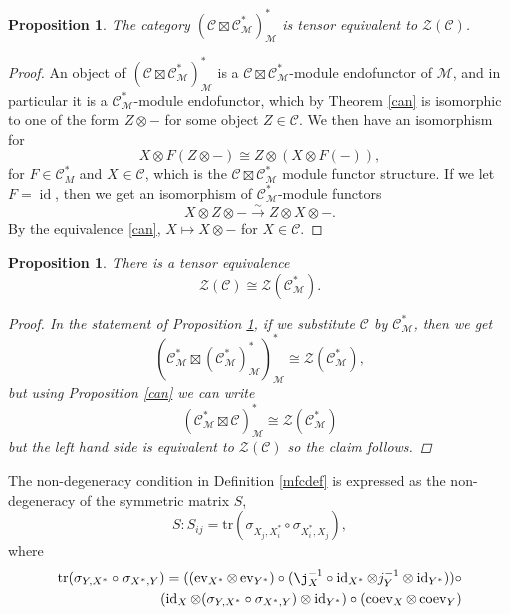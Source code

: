 \documentclass[11pt]{book}
\newtheorem{Prop}[theorem]{Proposition}
\theoremstyle{Rem}
\theoremstyle{definition}
\numberwithin{equation}{section}
\newcommand\inv{^{-1}}
\newcommand\id{\operatorname{id}}
\newcommand\ot{\otimes}
\newcommand\M{\mathcal{M}}
\newcommand\C{\mathcal C}
\newcommand\CTR{\mathcal Z}
\newcommand{\xra}\xrightarrow
\newcommand\ev{\operatorname{ev}}
\newcommand\coev{\operatorname{coev}}
\begin{document}
\begin{Prop}\label{centereqv}
The category $(\C\boxtimes \C^*_\M)^*_\M$ is tensor equivalent to $\CTR(\C)$.
\end{Prop}
\begin{proof}
An object of $(\C\boxtimes \C^*_\M)^*_\M$ is a $\C\boxtimes \C^*_\M$-module endofunctor of $\M$, and in particular it is a $\C^*_\M$-module endofunctor, which by Theorem \ref{can} is isomorphic to one of the form $Z\ot -$ for some object $Z\in \C$. We then have an isomorphism for \begin{equation}
	X\ot F(Z\ot -) \cong Z\ot(X\ot F(-)),
\end{equation}for $F\in \C^*_M$ and $X \in \C$, which is the $\C \boxtimes \C^*_\M$ module functor structure. If we let $F=\id$, then we get an isomorphism of $\C^*_\M$-module functors \begin{equation}
	X\ot Z \ot -\xra{\sim} Z\ot X\ot -.
\end{equation}
By the equivalence \ref{can}, $X\mapsto X\ot -$ for $X\in \C$. 

\end{proof}
\begin{Prop}
There is a tensor equivalence \begin{equation}
	\CTR(\C)\cong \CTR(\C^*_\M).
\end{equation}
\begin{proof}
In the statement of Proposition \ref{centereqv}, if we substitute $\C$ by $\C^*_\M$, then we get 
\begin{equation}
	(\C^*_\M \boxtimes (\C^*_\M)^*_\M)^*_\M \cong \CTR(\C^*_\M),
\end{equation} but using Proposition \ref{can} we can write \begin{equation}
	(\C^*_\M \boxtimes \C)^*_\M \cong \CTR(\C^*_\M)
\end{equation} but the left hand side is equivalent to $\CTR(\C)$ so the claim follows.
\end{proof}
\end{Prop}

 The non-degeneracy condition in Definition \ref{mfcdef} is expressed as the non-degeneracy of the symmetric matrix $S$, 
\begin{equation}\label{S}
	S: S_{ij}= \text{tr}(\sigma_{X_j,X_i^*}\circ\sigma_{X_i^*,X_j}),
\end{equation}
where \begin{align}
	\text{tr}(\sigma_{Y,X^*}\circ\sigma_{X^*,Y}) = ((\ev_{X^*}\otimes \ev_{Y^*}) \circ (\j_{X}\inv\circ\id_{X^*} \otimes j_Y\inv \otimes \id_{Y^*}))\circ\\ (\id_X\otimes (\sigma_{Y,X^*}\circ\sigma_{X^*, Y}) \otimes \id_{Y^*})\circ (\coev_X \otimes \coev_Y) \label{Strace}
\end{align}
\end{document}
